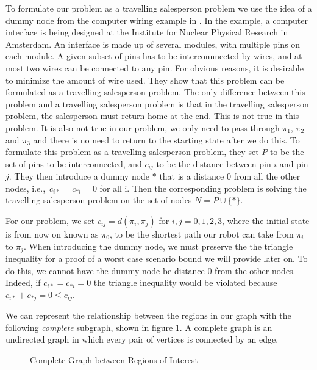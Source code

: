 To formulate our problem as a travelling salesperson problem we use the idea of a dummy node from the computer wiring example in \cite{lenstra75}. In the example, a computer interface is being designed at the Institute for Nuclear Physical Research in Amsterdam. An interface is made up of several modules, with multiple pins on each module. A given subset of pins has to be interconnnected by wires, and at most two wires can be connected to any pin. For obvious reasons, it is desirable to minimize the amount of wire used. They show that this problem can be formulated as a travelling salesperson problem. The only difference between this problem and a travelling salesperson problem is that in the travelling salesperson problem, the salesperson must return home at the end. This is not true in this problem. It is also not true in our problem, we only need to pass through $\pi_1$, $\pi_2$ and $\pi_3$ and there is no need to return to the starting state after we do this. To formulate this problem as a travelling salesperson problem, they set $P$ to be the set of pins to be interconnected, and $c_{ij}$ to be the distance between pin $i$ and pin $j$. They then introduce a dummy node $*$ that is a distance 0 from all the other nodes, i.e.,\ $c_{i*} = c_{*i} = 0$ for all i. Then the corresponding problem is solving the travelling salesperson problem on the set of nodes $N=P \cup \{*\}$. 

For our problem, we set $c_{ij}=d(\pi_i , \pi_j)$ for $i,j=0,1,2,3$, where the initial state is from now on known as $\pi_0$, to be the shortest path our robot can take from $\pi_i$ to $\pi_j$. When introducing the dummy node, we must preserve the the triangle inequality for a proof of a worst case scenario bound we will provide later on. To do this, we cannot have the dummy node be distance 0 from the other nodes. Indeed, if $c_{i*} = c_{*i} = 0 $ the triangle inequality would be violated because $c_{i*} + c_{*j} = 0 \leq c_{ij}$.

We can represent the relationship between the regions in our graph with the following \textit{complete} subgraph, shown in figure \ref{fig:completeGraph}. A complete graph is an undirected graph in which every pair of vertices is connected by an edge. 
\begin{figure}
\centering
{}
\caption{Complete Graph between Regions of Interest}
\label{fig:completeGraph}
\end{figure}

